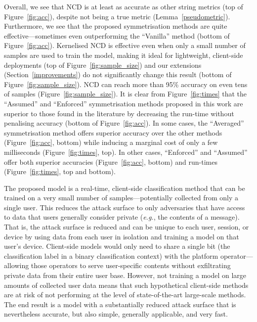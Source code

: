 \documentclass[preprint,12pt]{article}
\begin{document}
Overall, we see that NCD is at least as accurate as other string metrics (top of Figure~\ref{fig:acc}), despite not being a true metric (Lemma~\ref{pseudometric}).
Furthermore, we see that the proposed symmetrisation methods are quite effective---sometimes even outperforming the ``Vanilla'' method (bottom of Figure~\ref{fig:acc}).
Kernelised NCD is effective even when only a small number of samples are used to train the model, making it ideal for lightweight, client-side deployments (top of Figure~\ref{fig:sample_size}) and our extensions (Section~\ref{improvements}) do not significantly change this result (bottom of Figure~\ref{fig:sample_size}).
NCD can reach more than 95\% accuracy on even tens of samples (Figure~\ref{fig:sample_size}).
It is clear from Figure~\ref{fig:times} that the ``Assumed'' and ``Enforced'' symmetrisation methods proposed in this work are superior to those found in the literature by decreasing the run-time without penalising accuracy (bottom of Figure~\ref{fig:acc}).
In some cases, the ``Averaged'' symmetrisation method offers superior accuracy over the other methods (Figure~\ref{fig:acc}, bottom) while inducing a marginal cost of only a few milliseconds (Figure~\ref{fig:times}, top).
In other cases, ``Enforced'' and ``Assumed'' offer both superior accuracies (Figure~\ref{fig:acc}, bottom) and run-times (Figure~\ref{fig:times}, top and bottom).

The proposed model is a real-time, client-side classification method that can be trained on a very small number of samples---potentially collected from only a single user.
This reduces the attack surface to only adversaries that have access to data that users generally consider private (\textit{e.g.}, the contents of a message).
That is, the attack surface is reduced and can be unique to each user, session, or device by using data from each user in isolation and training a model on that user's device. Client-side models would only need to share a single bit (the classification label in a binary classification context) with the platform operator---allowing those operators to serve user-specific contents without exfiltrating private data from their entire user base.
However, not training a model on large amounts of collected user data means that such hypothetical client-side methods are at risk of not performing at the level of state-of-the-art large-scale methods.
The end result is a model with a substantially reduced attack surface that is nevertheless accurate, but also simple, generally applicable, and very fast.





\end{document}
